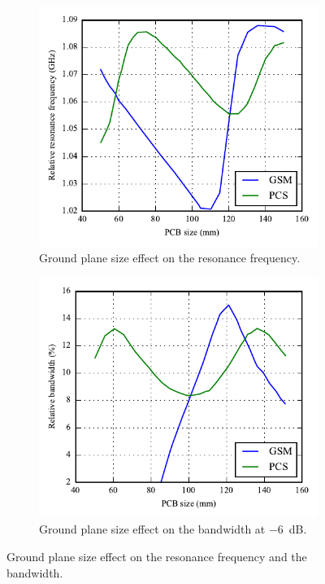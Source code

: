 \begin{figure}[htbp]
   \begin{subfigure}[b]{0.49\linewidth}
        \centering
        \includegraphics{img/analysis/pcbsize_freq.pdf}
        \caption{Ground plane size effect on the resonance frequency.}
    \end{subfigure}
    \hfill
    \begin{subfigure}[b]{0.49\linewidth}
        \centering
        \includegraphics{img/analysis/pcbsize_bandwidth.pdf}
        \caption{Ground plane size effect on the bandwidth at \SI{-6}{dB}.}
    \end{subfigure}
    \caption{Ground plane size effect on the resonance frequency and the bandwidth\cite{sanchez2008multiband}.}
    \label{fig:antenna_pcb_behavior}
\end{figure}

